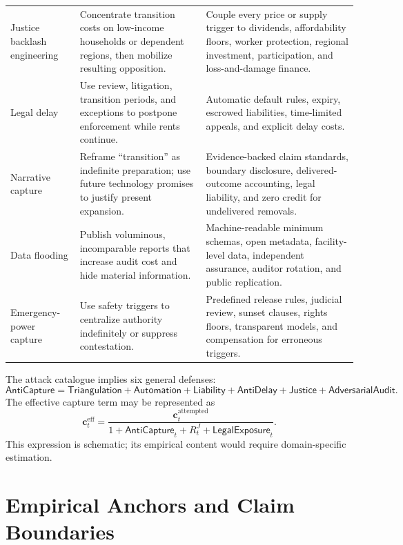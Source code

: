 \documentclass[11pt,a4paper]{article}
\numberwithin{equation}{section}
\theoremstyle{definition}
\theoremstyle{plain}
\theoremstyle{remark}
\newcommand{\capture}{\bm{c}}
\begin{document}
\begin{longtable}{@{}L{0.17\textwidth}L{0.34\textwidth}L{0.41\textwidth}@{}}
\addlinespace
Justice backlash engineering & Concentrate transition costs on low-income households or dependent regions, then mobilize resulting opposition. & Couple every price or supply trigger to dividends, affordability floors, worker protection, regional investment, participation, and loss-and-damage finance. \\
\addlinespace
Legal delay & Use review, litigation, transition periods, and exceptions to postpone enforcement while rents continue. & Automatic default rules, expiry, escrowed liabilities, time-limited appeals, and explicit delay costs. \\
\addlinespace
Narrative capture & Reframe ``transition'' as indefinite preparation; use future technology promises to justify present expansion. & Evidence-backed claim standards, boundary disclosure, delivered-outcome accounting, legal liability, and zero credit for undelivered removals. \\
\addlinespace
Data flooding & Publish voluminous, incomparable reports that increase audit cost and hide material information. & Machine-readable minimum schemas, open metadata, facility-level data, independent assurance, auditor rotation, and public replication. \\
\addlinespace
Emergency-power capture & Use safety triggers to centralize authority indefinitely or suppress contestation. & Predefined release rules, judicial review, sunset clauses, rights floors, transparent models, and compensation for erroneous triggers. \\
\bottomrule
\end{longtable}

The attack catalogue implies six general defenses:
\begin{equation}
\mathsf{AntiCapture}=
\mathsf{Triangulation}+\mathsf{Automation}+\mathsf{Liability}
+\mathsf{AntiDelay}+\mathsf{Justice}+\mathsf{AdversarialAudit}.
\label{eq:anticapture}
\end{equation}
The effective capture term may be represented as
\begin{equation}
\capture_t^{\mathrm{eff}}=
\frac{\capture_t^{\mathrm{attempted}}}
{1+\mathsf{AntiCapture}_t+R_t^J+\mathsf{LegalExposure}_t}.
\label{eq:effectivecapture}
\end{equation}
This expression is schematic; its empirical content would require domain-specific estimation.

\section{Empirical Anchors and Claim Boundaries}
\end{document}
